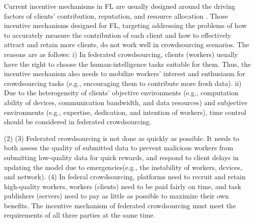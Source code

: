\documentclass[final,1p,times]{elsarticle}
\begin{document}
Current incentive mechanisms in FL are usually designed around the driving factors of clients’ contribution, reputation, and resource allocation \citep{zhan2020learning,zhan2021survey}. Those incentive mechanisms designed for FL, targeting addressing the problems of how to accurately measure the contribution of each client and how to effectively attract and retain more clients, do not work well in crowdsourcing scenarios. The reasons are as follows: i) In federated crowdsourcing, clients (workers) usually have the right to choose the human-intelligence tasks suitable for them. Thus, the incentive mechanism also needs to mobilize workers' interest and enthusiasm for crowdsourcing tasks (e.g., encouraging them to contribute more fresh data). ii) Due to the heterogeneity of clients' objective environments (e.g., computation ability of devices, communication bandwidth, and data resources) and subjective environments (e.g., expertise, dedication, and intention of workers), time control should be considered in federated crowdsourcing.

 (2)  (3) Federated crowdsourcing is not done as quickly as possible. It needs to both assess the quality of submitted data to prevent malicious workers from submitting low-quality data for quick rewards, and respond to client delays in updating the model due to emergencies(e.g., the instability of workers, devices, and network). (4) In federal crowdsourcing, platforms need to recruit and retain high-quality workers, workers (clients) need to be paid fairly on time, and task publishers (servers) need to pay as little as possible to maximize their own benefits. The incentive mechanism of federated crowdsourcing must meet the requirements of all three parties at the same time.
\end{document}
